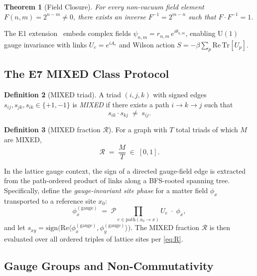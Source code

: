 \documentclass[12pt,a4paper]{article}
\newcommand{\R}{\mathcal{R}}           %
\newcommand{\UN}[1]{\mathrm{U}(#1)}
\theoremstyle{plain}
\newtheorem{theorem}{Theorem}[section]
\theoremstyle{definition}
\newtheorem{definition}[theorem]{Definition}
\theoremstyle{remark}
\begin{document}
\begin{theorem}[Field Closure]
For every non-vacuum field element $F(n,m)=2^{n-m}\neq 0$, there exists an inverse
$F^{-1}=2^{m-n}$ such that $F\cdot F^{-1}=1$.
\end{theorem}

The E1 extension~\citep{HGST_E1} embeds complex fields
$\psi_{n,m}=r_{n,m}\,e^{i\theta_{n,m}}$, enabling $\UN{1}$ gauge invariance with links
$U_e=e^{iA_e}$ and Wilson action $S=-\beta\sum_p \mathrm{Re}\,\mathrm{Tr}[U_p]$.

\subsection{The E7 MIXED Class Protocol}

\begin{definition}[MIXED triad]
\label{def:mixed}
A triad $(i,j,k)$ with signed edges $s_{ij},s_{jk},s_{ik}\in\{+1,-1\}$ is \emph{MIXED}
if there exists a path $i\to k \to j$ such that
\begin{equation}
  s_{ik}\cdot s_{kj} \;\neq\; s_{ij}.
  \label{eq:mixed}
\end{equation}
\end{definition}

\begin{definition}[MIXED fraction $\R$]
For a graph with $T$ total triads of which $M$ are MIXED,
\begin{equation}
  \R \;=\; \frac{M}{T} \;\in\; [0,1].
  \label{eq:R}
\end{equation}
\end{definition}

In the lattice gauge context, the sign of a directed gauge-field edge is extracted from
the path-ordered product of links along a BFS-rooted spanning tree.
Specifically, define the \emph{gauge-invariant site phase} for a matter field
$\phi_x$ transported to a reference site $x_0$:
\begin{equation}
  \phi_x^{(\text{gauge})} \;=\; \mathcal{P}\!\!\prod_{e\in\mathrm{path}(x_0\to x)} U_e\;\cdot\;\phi_x,
\end{equation}
and let $s_{xy}=\mathrm{sign}\bigl(\mathrm{Re}\langle\phi_x^{(\text{gauge})},\phi_y^{(\text{gauge})}\rangle\bigr)$.
The MIXED fraction $\R$ is then evaluated over all ordered triples of lattice sites per
\cref{eq:R}.

\subsection{Gauge Groups and Non-Commutativity}
\end{document}
